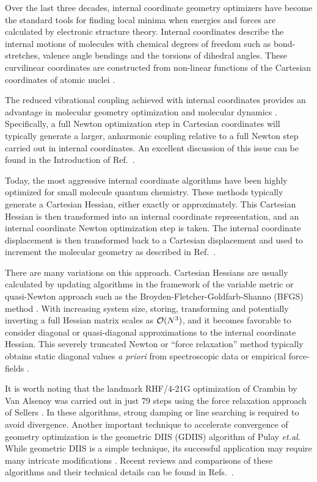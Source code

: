 \documentclass[prl,twocolumn,showpacs,twocolumngrid,superbib]{revtex4}
\begin{document}
Over the last three decades, internal coordinate geometry optimizers have become the standard 
tools for finding local minima when energies and forces are calculated by electronic structure 
theory. Internal coordinates describe the internal motions of molecules 
with chemical degrees of freedom such as bond-stretches, valence angle bendings and the torsions 
of dihedral angles. These curvilinear coordinates are constructed from non-linear functions of the 
Cartesian coordinates of atomic nuclei \cite{EWilson55}.

The reduced vibrational coupling achieved with internal coordinates provides an advantage 
in molecular geometry optimization \cite{PPulay77} and molecular dynamics \cite{PPulay02}.
Specifically, a full Newton optimization step in Cartesian coordinates will typically generate a larger, 
anharmonic coupling relative to a full Newton step carried out in internal coordinates.
An excellent discussion of this issue can be found in the Introduction of Ref.~.

Today, the most aggressive internal coordinate algorithms have been highly optimized for 
small molecule quantum chemistry.  These methods typically generate a Cartesian Hessian,
either exactly or approximately. This Cartesian Hessian is then transformed into an internal 
coordinate representation, and an internal coordinate Newton optimization step is taken. The internal 
coordinate 
displacement
is then transformed back to a Cartesian displacement and used to increment the 
molecular geometry as described in Ref.~.

There are many variations on this approach.  Cartesian Hessians are usually calculated by updating 
algorithms in the framework of the variable metric or quasi-Newton approach such as the  
Broyden-Fletcher-Goldfarb-Shanno (BFGS) method \cite{RFletcher81}.  With increasing system size, storing,
transforming and potentially inverting a full Hessian matrix scales as ${\cal O}(N^3)$, and it becomes
favorable to consider diagonal or 
quasi-diagonal
approximations to the internal coordinate Hessian. 
This severely truncated Newton or  ``force relaxation'' method typically obtains static diagonal values 
{\em a priori} from spectroscopic data or empirical force-fields 
\cite{PPulay69,GFogarasi79,GFogarasi92,PPulay77,HSellers78,CVanAlsenoy98,RLindh95}.

It is worth noting that the landmark RHF/4-21G optimization of Crambin by Van Alsenoy \cite{CVanAlsenoy98}
was carried out in just 79 steps using the force relaxation approach of Sellers \cite{HSellers78}.
In these algorithms, strong damping \cite{HSellers78} or line searching \cite{HSchlegel82}
is required to avoid divergence. Another important technique to accelerate convergence of 
geometry optimization is the geometric DIIS (GDIIS) \cite{PPulay84} 
algorithm of Pulay
{\it et.al}. While geometric DIIS is a simple 
technique, its successful application may require many intricate modifications \cite{OFarkas02}.  
Recent reviews and comparisons of these algorithms and their technical details can be found in 
Refs.~.
\end{document}
